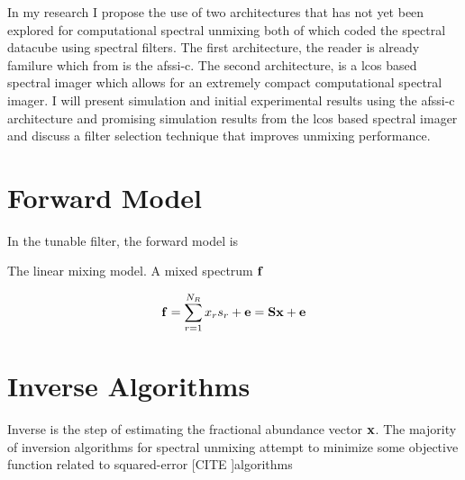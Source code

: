 In my research I propose the use of two architectures that has not yet been explored for computational spectral unmixing both of which coded the spectral datacube using spectral filters. The first architecture, the reader is already familure which from  is the \acrfull{afssi-c}. The second architecture, is a \acrfull{lcos} based spectral imager which allows for an extremely compact computational spectral imager. I will present simulation and initial experimental results using the \gls{afssi-c} architecture and promising simulation results from the \gls{lcos} based spectral imager and discuss a filter selection technique that improves unmixing performance.

%  
%

\section{Forward Model}



In the \gls{tunable filter}, the forward model is 

The linear mixing model. A mixed spectrum $\mathbf{f}$

\begin{equation}
\mathbf{f} = \sum_{r=1}^{N_{R}} x_r s_r + \mathbf{e} = \mathbf{S} \mathbf{x}  + \mathbf{e}
\end{equation}

\section{Inverse Algorithms}

Inverse is the step of estimating the fractional abundance vector $\mathbf{x}$. The majority of inversion algorithms for spectral unmixing attempt to minimize some objective function related to squared-error [CITE ]algorithms